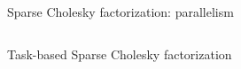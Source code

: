 \documentclass{beamer}
\begin{document}
\begin{frame}{Sparse Cholesky factorization: parallelism}
\begin{columns}
\begin{column}{0.4\textwidth}
    \end{column}

  \end{columns}

\end{frame}

\begin{frame}{Task-based Sparse Cholesky factorization}
  \only<1>{}
\end{frame}
\end{document}
